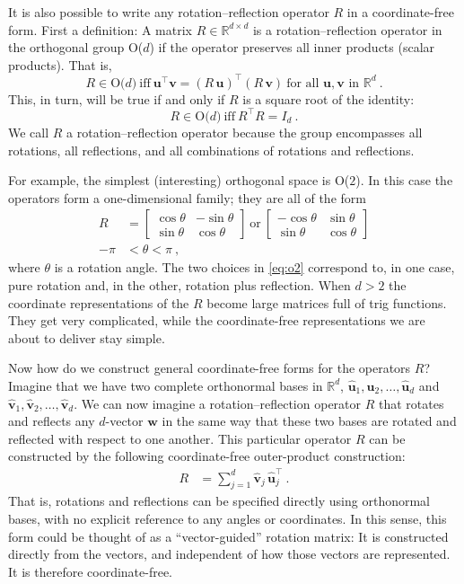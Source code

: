 \documentclass{article}
\newcommand{\Evec}[1]{{\mathbf{#1}}} %
\newcommand{\Ehat}[1]{{\mathbf{\hat{#1}}}} %
\begin{document}
It is also possible to write any rotation--reflection operator $R$ in a coordinate-free form.
First a definition: A matrix $R\in\mathbb{R}^{d\times d}$ is a rotation--reflection operator in the orthogonal group O($d$) if the operator preserves all inner products (scalar products).
That is,
\begin{equation}
    R \in \mbox{O($d$)} ~ \mbox{iff} ~ \Evec{u}^\top\Evec{v}=(R\,\Evec{u})^\top(R\,\Evec{v}) ~ \mbox{for all $\Evec{u},\Evec{v}$ in $\mathbb{R}^d$} ~.\label{eq:orth1}
\end{equation}
This, in turn, will be true if and only if $R$ is a square root of the identity:
\begin{equation}
    R \in \mbox{O($d$)} ~ \mbox{iff} ~ R^\top R=I_d ~.\label{eq:orth2}
\end{equation}
We call $R$ a rotation--reflection operator because the group encompasses all rotations, all reflections, and all combinations of rotations and reflections.

For example, the simplest (interesting) orthogonal space is O($2$). In this case the operators form a one-dimensional family; they are all of the form
\begin{align}
    R &= \begin{bmatrix}\cos{\theta} & -\sin{\theta} \\ \sin{\theta} & \cos{\theta}\end{bmatrix} ~\mbox{or}~
    \begin{bmatrix}-\cos{\theta} & \sin{\theta} \\ \sin{\theta} & \cos{\theta}\end{bmatrix} \label{eq:o2}
    \\
    -\pi &< \theta < \pi ~, \nonumber
\end{align}
where $\theta$ is a rotation angle.
The two choices in \eqref{eq:o2} correspond to, in one case, pure rotation and, in the other, rotation plus reflection.
When $d>2$ the coordinate representations of the $R$ become large matrices full of trig functions.
They get very complicated, while the coordinate-free representations we are about to deliver stay simple.

Now how do we construct general coordinate-free forms for the operators $R$?
Imagine that we have two complete orthonormal bases in $\mathbb{R}^d$, $\Ehat{u}_1,\Ehat{u}_2,\ldots,\Ehat{u}_d$ and $\Ehat{v}_1,\Ehat{v}_2,\ldots,\Ehat{v}_d$.
We can now imagine a rotation--reflection operator $R$ that rotates and reflects any $d$-vector $\Evec{w}$ in the same way that these two bases are rotated and reflected with respect to one another.
This particular operator $R$ can be constructed by the following coordinate-free outer-product construction:
\begin{align}
    R &= \sum_{j=1}^d \Ehat{v}_j\,\Ehat{u}_j^\top ~.\label{eq:rotationoperator}
\end{align}
That is, rotations and reflections can be specified directly using orthonormal bases, with no explicit reference to any angles or coordinates.
In this sense, this form could be thought of as a ``vector-guided'' rotation matrix:
It is constructed directly from the vectors, and independent of how those vectors are represented.
It is therefore coordinate-free.
\end{document}

